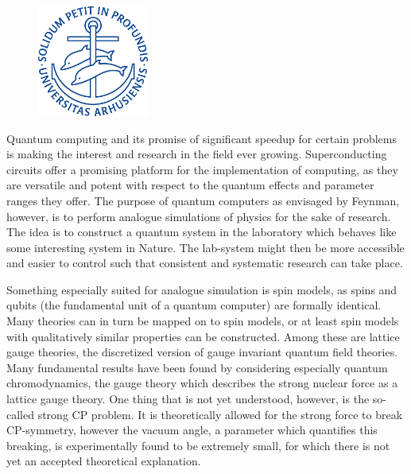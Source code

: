 \documentclass[../main.tex]{subfiles} %
\begin{document}
\clearpage %


\begin{figure}[ht!] %
    \begin{center}
        \includegraphics[width=3.65cm]{afterText/backCoverImages/auseglBlue.eps}
    \end{center}
\end{figure} %

\vspace{1em}
\vfill

Quantum computing and its promise of significant speedup for certain problems
is making the interest and research in the field ever growing. Superconducting
circuits offer a promising platform for the implementation of computing,
as they are versatile and potent with respect to the quantum effects and
parameter ranges they offer. The purpose of quantum computers as envisaged
by Feynman, however, is to perform analogue simulations of physics for the
sake of research. The idea is to construct a quantum system in the laboratory
which behaves like some interesting system in Nature. The lab-system
might then be more accessible and easier to control such that consistent and
systematic research can take place.

Something especially suited for analogue simulation is spin models, as spins
and qubits (the fundamental unit of a quantum computer) are formally identical.
Many theories can in turn be mapped on to spin models, or at least spin
models with qualitatively similar properties can be constructed. Among these
are lattice gauge theories, the discretized version of gauge invariant quantum
field theories. Many fundamental results have been found by considering especially
quantum chromodynamics, the gauge theory which describes the strong
nuclear force as a lattice gauge theory. One thing that is not yet understood,
however, is the so-called strong CP problem. It is theoretically allowed for the
strong force to break CP-symmetry, however the vacuum angle, a parameter
which quantifies this breaking, is experimentally found to be extremely small,
for which there is not yet an accepted theoretical explanation.
\end{document}
